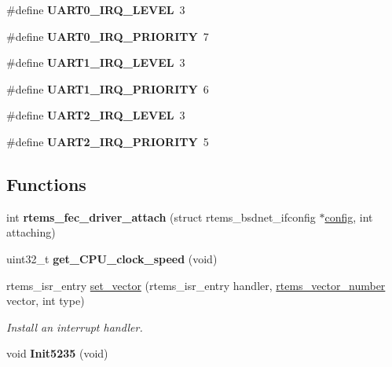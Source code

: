 \begin{DoxyCompactItemize}
\#define {\bfseries U\+A\+R\+T0\+\_\+\+I\+R\+Q\+\_\+\+L\+E\+V\+EL}~3
\item 
\mbox{\label{group__RTEMSBSPsM68kMCF5235_ga421617dbbfc69fbbe3e88835e4c26dc5}} 
\#define {\bfseries U\+A\+R\+T0\+\_\+\+I\+R\+Q\+\_\+\+P\+R\+I\+O\+R\+I\+TY}~7
\item 
\mbox{\label{group__RTEMSBSPsM68kMCF5235_ga8db7b2e20155ab9adf447660e92010b1}} 
\#define {\bfseries U\+A\+R\+T1\+\_\+\+I\+R\+Q\+\_\+\+L\+E\+V\+EL}~3
\item 
\mbox{\label{group__RTEMSBSPsM68kMCF5235_gafa24779091dd9f575af1f8482cea5b2a}} 
\#define {\bfseries U\+A\+R\+T1\+\_\+\+I\+R\+Q\+\_\+\+P\+R\+I\+O\+R\+I\+TY}~6
\item 
\mbox{\label{group__RTEMSBSPsM68kMCF5235_ga4fa66263959fe836ffc8cc89554a22e7}} 
\#define {\bfseries U\+A\+R\+T2\+\_\+\+I\+R\+Q\+\_\+\+L\+E\+V\+EL}~3
\item 
\mbox{\label{group__RTEMSBSPsM68kMCF5235_gabe7562294780b56d1dd0e8cc91df557e}} 
\#define {\bfseries U\+A\+R\+T2\+\_\+\+I\+R\+Q\+\_\+\+P\+R\+I\+O\+R\+I\+TY}~5
\end{DoxyCompactItemize}
\subsection*{Functions}
\begin{DoxyCompactItemize}
\item 
\mbox{\label{group__RTEMSBSPsM68kMCF5235_ga584ad500075555d3cd0a4f895d73df04}} 
int {\bfseries rtems\+\_\+fec\+\_\+driver\+\_\+attach} (struct rtems\+\_\+bsdnet\+\_\+ifconfig $\ast$\mbox{\hyperlink{structconfig__s}{config}}, int attaching)
\item 
\mbox{\label{group__RTEMSBSPsM68kMCF5235_gaac0f9f3f7c56eaee7f0d4ddcca226d24}} 
uint32\+\_\+t {\bfseries get\+\_\+\+C\+P\+U\+\_\+clock\+\_\+speed} (void)
\item 
rtems\+\_\+isr\+\_\+entry \mbox{\hyperlink{group__RTEMSBSPsM68kMCF5235_gab3388042c56b34c40be81fd5f028d97e}{set\+\_\+vector}} (rtems\+\_\+isr\+\_\+entry handler, \mbox{\hyperlink{group__ClassicINTR_ga3e434c197d99f128e78cae4d9358bd8b}{rtems\+\_\+vector\+\_\+number}} vector, int type)
\begin{DoxyCompactList}\small\item\em Install an interrupt handler. \end{DoxyCompactList}\item 
\mbox{\label{group__RTEMSBSPsM68kMCF5235_ga54352a2dd08db9251c5e620b1ee4d38a}} 
void {\bfseries Init5235} (void)
\end{DoxyCompactItemize}


